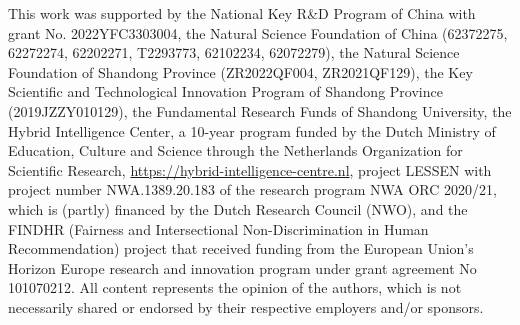 \begin{acks}
This work was supported by the National
Key R\&D Program of China with grant No. 2022YFC3303004, the Natural Science Foundation of China (62372275, 62272274, 62202271, T2293773, 62102234, 62072279), the Natural Science Foundation of Shandong Province (ZR2022QF004, ZR2021QF129), the
Key Scientific and Technological Innovation Program of Shandong Province (2019JZZY010129),
the Fundamental Research Funds of Shandong University,
the Hybrid Intelligence Center, a 10-year program funded by the Dutch Ministry of Education, Culture and Science through the Netherlands Organization for Scientific Research, \url{https://hybrid-intelligence-centre.nl}, project LESSEN with project number NWA.1389.20.183 of the research program NWA ORC 2020/21, which is (partly) financed by the Dutch Research Council (NWO),
and 
the FINDHR (Fairness and Intersectional Non-Discrimination in Human Recommendation) project that received funding from the European Union’s Horizon Europe research and innovation program under grant agreement No 101070212. 
All content represents the opinion of the authors, which is not necessarily shared or endorsed by their respective employers and/or sponsors.
\end{acks}